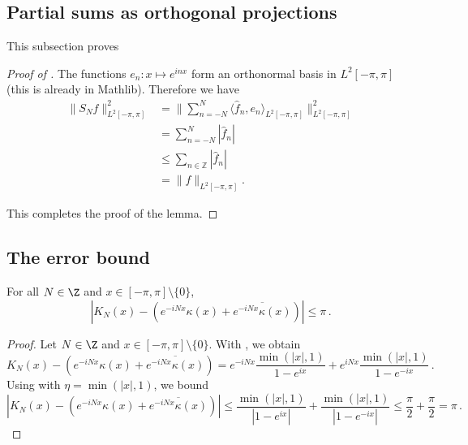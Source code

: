 \subsection{Partial sums as orthogonal projections}
\label{10projection}

This subsection proves 

\begin{proof}[Proof of ]
\leanok

The functions $e_n:x\mapsto e^{inx}$ form an orthonormal basis in $L^2[-\pi, \pi]$
(this is already in Mathlib).
Therefore we have
\begin{align*}
    \|S_Nf\|^2_{L^2[-\pi, \pi]}
    &= \|\sum_{n=-N}^N \langle\widehat{f}_n, e_n\rangle_{L^2[-\pi, \pi]}\|^2_{L^2[-\pi, \pi]} \\
    &= \sum_{n=-N}^N |\widehat{f}_n| \\
    &\le \sum_{n\in \mathbb{Z}} |\widehat{f}_n| \\
    &= \|f\|_{L^2[-\pi, \pi]}.
\end{align*}

This completes the proof of the lemma.
\end{proof}

\subsection{The error bound}
\label{10difference}

\begin{lemma}
    \label{Dirichlet-Hilbert}
    \leanok
    For all $N\in\Z$ and $x\in [-\pi,\pi] \setminus \{0\}$,
    \begin{equation*}
        \left|K_N(x) - (e^{-iNx}\kappa(x) + \overline{e^{-iNx}\kappa(x)})\right| \le \pi \,.
    \end{equation*}
\end{lemma}

\begin{proof}
    \leanok
    Let $N\in\Z$ and $x\in [-\pi,\pi] \setminus \{0\}$. With , we obtain
    \begin{equation*}
        K_N(x) - (e^{-iNx}\kappa(x) + \overline{e^{-iNx}\kappa(x)})
        = e^{-iNx} \frac{\min(|x|, 1) }{1 - e^{ix}} + e^{iNx} \frac{\min(|x|, 1) }{1 - e^{-ix}} \,.
    \end{equation*}
    Using  with $\eta = \min(|x|, 1)$, we bound
    \begin{equation*}
        \left|K_N(x) - (e^{-iNx}\kappa(x) + \overline{e^{-iNx}\kappa(x)})\right|
        \le \frac{\min(|x|, 1) }{|1 - e^{ix}|} + \frac{\min(|x|, 1)}{|1 - e^{-ix}|}
        \le \frac{\pi}{2} + \frac{\pi}{2} = \pi \,.
    \end{equation*}
\end{proof}

